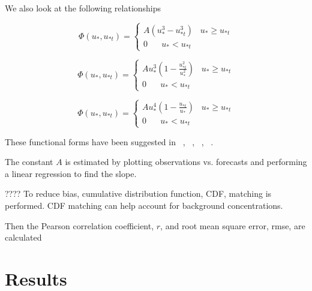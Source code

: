 \documentclass[draft]{agujournal2018}
\begin{document}
We also look at the following relationships

\begin{equation}
\Phi(u_*, u_{*t}) =\begin{cases}
A(u_*^3 - u_{*t}^3)  \;\;\; u_{*} \geq u_{*t} \\
0 \;\;\;\;\;\;  u_* < u_{*t} 
\end{cases}
\label{eq:leadbetter}
\end{equation}


\begin{equation}
\Phi(u_*, u_{*t}) =\begin{cases}
Au_*^3 (1-\frac{u_{*t}^2}{u_{*}^2})  \;\;\; u_{*} \geq u_{*t} \\
0 \;\;\;\;\;\;  u_* < u_{*t} 
\end{cases}
\label{eq:shao}
\end{equation}

\begin{equation}
\Phi(u_*, u_{*t}) =\begin{cases}
Au_*^4 (1-\frac{u_{*t}}{u_{*}})  \;\;\; u_{*} \geq u_{*t} \\
0 \;\;\;\;\;\;  u_* < u_{*t} 
\end{cases}
\label{eq:gillette}
\end{equation}

These functional forms have been suggested in ~\cite{Shao08}, ~\cite{Gillette}, ~\cite{Marticorena}, ~\cite{Leadbetter12}.

The constant $A$ is estimated by plotting observations vs. forecasts and performing a linear regression to find the slope.

????
To reduce bias, cumulative distribution function, CDF,  matching is performed. CDF matching can help account for
background concentrations.

Then the Pearson correlation coefficient, $r$,  and root mean square error, rmse, are calculated 


\section{Results}
\end{document}
